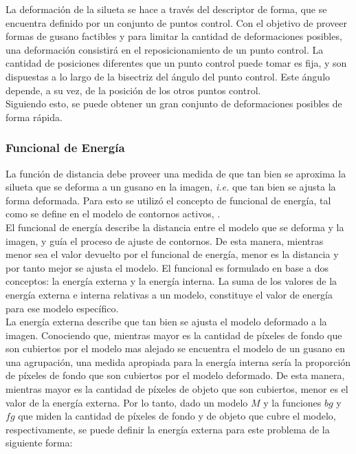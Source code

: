 La deformaci\'on de la silueta se hace a trav\'es del descriptor de forma, que se 
encuentra definido por un conjunto de puntos control. Con el objetivo de proveer
formas de gusano factibles y para limitar la cantidad de deformaciones posibles,
una deformaci\'on consistir\'a en el reposicionamiento de un punto control.
La cantidad de posiciones diferentes que un punto control puede tomar es fija,
y son dispuestas a lo largo de la bisectriz del \'angulo del punto control. 
Este \'angulo depende, a su vez, de la posici\'on de los otros puntos control.\\
Siguiendo esto, se puede obtener un gran conjunto de deformaciones posibles
de forma r\'apida.

\subsubsection*{Funcional de Energ\'ia}
\label{sec:energyformulation} 

La funci\'on de distancia debe proveer una medida de que tan bien se aproxima la silueta que se
deforma a un gusano en la imagen, \emph{i.e.} que tan bien se ajusta la forma deformada.
Para esto se utiliz\'o el concepto de funcional de energ\'ia, tal como se define
en el modelo de contornos activos, \cite{snakes}.\\

El funcional de energ\'ia describe la distancia entre el modelo que se deforma 
y la imagen, y gu\'ia el proceso de ajuste de contornos. De esta manera, mientras menor
sea el valor devuelto por el funcional de energ\'ia, menor es la distancia y por tanto
mejor se ajusta el modelo. El funcional es formulado en base a dos 
conceptos: la energ\'ia externa y la energ\'ia interna. La suma de los valores
de la energ\'ia externa e interna relativas a un modelo, constituye el valor
de energ\'ia para ese modelo espec\'ifico.\\

La energ\'ia externa describe que tan bien se ajusta el modelo deformado a la 
imagen. Conociendo que, mientras mayor es la cantidad de p\'ixeles de fondo que son cubiertos 
por el modelo mas alejado se encuentra el modelo de un gusano en una agrupaci\'on, 
una medida apropiada para la energ\'ia interna ser\'ia 
la proporci\'on de p\'ixeles de fondo que son cubiertos por el modelo deformado.
De esta manera, mientras mayor es la cantidad de p\'ixeles de objeto 
que son cubiertos, menor es el valor de la energ\'ia externa.
Por lo tanto, dado un modelo $M$ y la funciones $bg$ y $fg$ que miden la cantidad
de p\'ixeles de fondo y de objeto que cubre el modelo, respectivamente, se puede
definir la energ\'ia externa para este problema de la siguiente forma:

